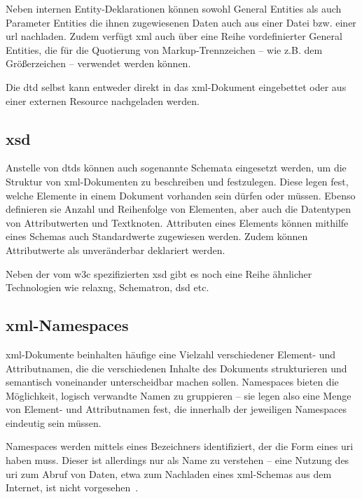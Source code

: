 Neben internen Entity-Deklarationen können sowohl General Entities als auch Parameter Entities die ihnen zugewiesenen Daten auch aus einer Datei bzw. einer \gls{url} nachladen.
Zudem verfügt \acrshort{xml} auch über eine Reihe vordefinierter General Entities, die für die Quotierung von Markup-Trennzeichen -- wie z.B. dem Größerzeichen -- verwendet werden können.

Die \gls{dtd} selbst kann entweder direkt in das \acrshort{xml}-Dokument eingebettet oder aus einer externen Resource nachgeladen werden.

\subsection{\acrfull{xsd}}
\label{sec:xsd}

Anstelle von \glspl{dtd} können auch sogenannte Schemata eingesetzt werden, um die Struktur von \acrshort{xml}-Dokumenten zu beschreiben und festzulegen. Diese legen fest, welche Elemente in einem Dokument vorhanden sein dürfen oder müssen. Ebenso definieren sie Anzahl und Reihenfolge von Elementen, aber auch die Datentypen von Attributwerten und Textknoten. Attributen eines Elements können mithilfe eines Schemas auch Standardwerte zugewiesen werden. Zudem können Attributwerte als unveränderbar deklariert werden.

Neben der vom \gls{w3c} spezifizierten \acrfull{xsd} gibt es noch eine Reihe ähnlicher Technologien wie \acrshort{relaxng}, Schematron, \gls{dsd} etc.

\subsection{\acrshort{xml}-Namespaces}
\label{sec:xmlns}

\acrshort{xml}-Dokumente beinhalten häufige eine Vielzahl verschiedener Element- und Attributnamen, die die verschiedenen Inhalte des Dokuments strukturieren und semantisch voneinander unterscheidbar machen sollen. Namespaces bieten die Möglichkeit, logisch verwandte Namen zu gruppieren -- sie legen also eine Menge von Element- und Attributnamen fest, die innerhalb der jeweiligen Namespaces eindeutig sein müssen.

Namespaces werden mittels eines Bezeichners identifiziert, der die Form eines \gls{uri} haben muss. Dieser ist allerdings nur als Name zu verstehen -- eine Nutzung des \gls{uri} zum Abruf von Daten, etwa zum Nachladen eines \acrshort{xml}-Schemas aus dem Internet, ist nicht vorgesehen~\cite[Abschn.~3]{xmlns}.

